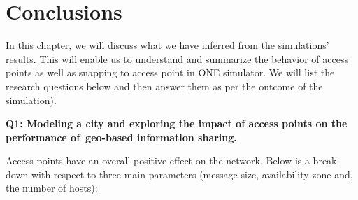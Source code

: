 
\chapter{Conclusions}\label{chapter:conclusions}
In this chapter, we will discuss what we have inferred from the simulations' results. This will enable us to understand and summarize the behavior of access points as well as snapping to access point in ONE simulator. We will list the research questions below and then answer them as per the outcome of the simulation).\newline

\textbf{Q1: Modeling a city and exploring the impact of access points on the performance of geo-based information sharing.} \newline

Access points have an overall positive effect on the network. Below is a break-down with respect to three main parameters (message size, availability zone and, the number of hosts):

